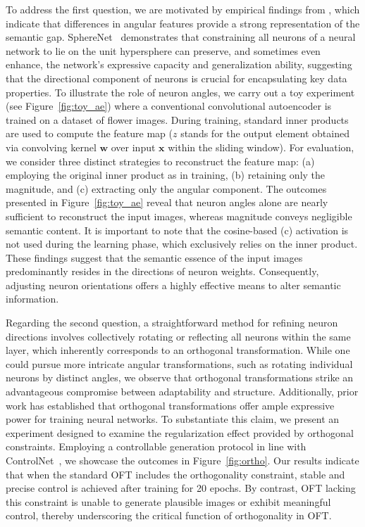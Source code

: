 To address the first question, we are motivated by empirical findings from \cite{liu2018decoupled,chen2020angular}, which indicate that differences in angular features provide a strong representation of the semantic gap. SphereNet~\cite{liu2017deep} demonstrates that constraining all neurons of a neural network to lie on the unit hypersphere can preserve, and sometimes even enhance, the network’s expressive capacity and generalization ability, suggesting that the directional component of neurons is crucial for encapsulating key data properties. To illustrate the role of neuron angles, we carry out a toy experiment (see Figure~\ref{fig:toy_ae}) where a conventional convolutional autoencoder is trained on a dataset of flower images. During training, standard inner products are used to compute the feature map ($z$ stands for the output element obtained via convolving kernel $\bm{w}$ over input $\bm{x}$ within the sliding window). For evaluation, we consider three distinct strategies to reconstruct the feature map: (a) employing the original inner product as in training, (b) retaining only the magnitude, and (c) extracting only the angular component. The outcomes presented in Figure~\ref{fig:toy_ae} reveal that neuron angles alone are nearly sufficient to reconstruct the input images, whereas magnitude conveys negligible semantic content. It is important to note that the cosine-based (c) activation is not used during the learning phase, which exclusively relies on the inner product. These findings suggest that the semantic essence of the input images predominantly resides in the directions of neuron weights. Consequently, adjusting neuron orientations offers a highly effective means to alter semantic information.

Regarding the second question, a straightforward method for refining neuron directions involves collectively rotating or reflecting all neurons within the same layer, which inherently corresponds to an orthogonal transformation. While one could pursue more intricate angular transformations, such as rotating individual neurons by distinct angles, we observe that orthogonal transformations strike an advantageous compromise between adaptability and structure. Additionally, prior work \cite{liu2021orthogonal} has established that orthogonal transformations offer ample expressive power for training neural networks. To substantiate this claim, we present an experiment designed to examine the regularization effect provided by orthogonal constraints. Employing a controllable generation protocol in line with ControlNet~\cite{zhang2023adding}, we showcase the outcomes in Figure~\ref{fig:ortho}. Our results indicate that when the standard OFT includes the orthogonality constraint, stable and precise control is achieved after training for 20 epochs. By contrast, OFT lacking this constraint is unable to generate plausible images or exhibit meaningful control, thereby underscoring the critical function of orthogonality in OFT.

